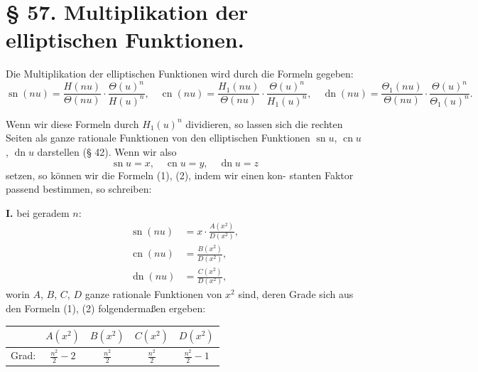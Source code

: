 \documentclass[12pt,a4paper]{article}
\theoremstyle{definition}
\begin{document}
\section*{\S{} 57. Multiplikation der elliptischen Funktionen.}

Die Multiplikation der elliptischen Funktionen wird durch
die Formeln gegeben:
\begin{equation}\tag{1}
\operatorname{sn}(nu) = \frac{H(nu)}{\Theta(nu)} \cdot \frac{\Theta(u)^n}{H(u)^n}, \quad
\operatorname{cn}(nu) = \frac{H_1(nu)}{\Theta(nu)} \cdot \frac{\Theta(u)^n}{H_1(u)^n}, \quad
\operatorname{dn}(nu) = \frac{\Theta_1(nu)}{\Theta(nu)} \cdot \frac{\Theta(u)^n}{\Theta_1(u)^n}.
\end{equation}

Wenn wir diese Formeln durch $H_1(u)^n$ dividieren, so lassen
sich die rechten Seiten als ganze rationale Funktionen von den
elliptischen Funktionen $\operatorname{sn} u$, $\operatorname{cn} u$, $\operatorname{dn} u$ darstellen (\S{} 42). Wenn
wir also
\begin{equation}\tag{2}
\operatorname{sn} u = x, \quad \operatorname{cn} u = y, \quad \operatorname{dn} u = z
\end{equation}
setzen, so k\"{o}nnen wir die Formeln (1), (2), indem wir einen kon-
stanten Faktor passend bestimmen, so schreiben:

\textbf{I.} bei geradem $n$:
\begin{equation}\tag{3}
\begin{aligned}
\operatorname{sn}(nu) &= x \cdot \frac{A(x^2)}{D(x^2)},\\
\operatorname{cn}(nu) &= \frac{B(x^2)}{D(x^2)},\\
\operatorname{dn}(nu) &= \frac{C(x^2)}{D(x^2)},
\end{aligned}
\end{equation}
worin $A$, $B$, $C$, $D$ ganze rationale Funktionen von $x^2$ sind, deren
Grade sich aus den Formeln (1), (2) folgenderma\ss en ergeben:
\begin{center}
\begin{tabular}{c|cccc}
& $A(x^2)$ & $B(x^2)$ & $C(x^2)$ & $D(x^2)$ \\
\hline
Grad: & $\frac{n^2}{2} - 2$ & $\frac{n^2}{2}$ & $\frac{n^2}{2}$ & $\frac{n^2}{2} - 1$
\end{tabular}
\end{center}
\end{document}
